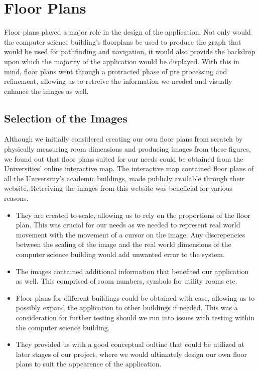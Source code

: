 \documentclass[main.tex]{subfiles}
\begin{document}
\chapter*{Floor Plans}
    
Floor plans played a major role in the design of the application. Not only would the computer science building's floorplans be used to produce the graph that would be used for pathfinding and navigation, it would also provide the backdrop upon which the majority of the application would be displayed. With this in mind, floor plans went through a protracted phase of pre processing and refinement, allowing us to retreive the information we needed and visually enhance the images as well.

\section*{Selection of the Images}

Although we initially considered creating our own floor plans from scratch by physically measuring room dimensions and producing images from these figures, we found out that floor plans suited for our needs could be obtained from the Universities' online interactive map. The interactive map contained floor plans of all the Universitiy's academic buildings, made publicly available through their website. Retreiving the images from this website was beneficial for various reasons.

\begin{itemize}

\item They are created to-scale, allowing us to rely on the proportions of the floor plan. This was crucial for our needs as we needed to represent real world movement with the movement of a cursor on the image. Any discrepencies between the scaling of the image and the real world dimensions of the computer science building would add unwanted error to the system.

\item The images contained additional information that benefited our application as well. This comprised of room numbers, symbols for utility rooms etc.

\item Floor plans for different buildings could be obtained with ease, allowing us to possibly expand the application to other buildings if needed. This was a consideration for further testing should we run into issues with testing within the computer science building.

\item They provided us with a good conceptual oultine that could be utilized at later stages of our project, where we would ultimately design our own floor plans to suit the appearence of the application.
\end{itemize}
		
\end{document}
